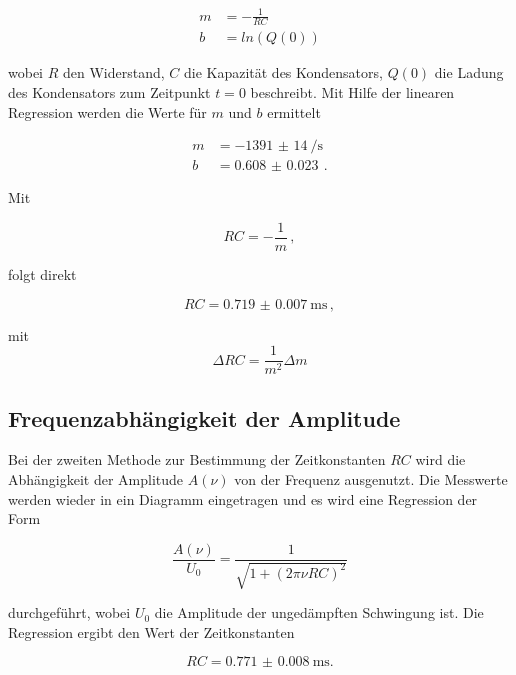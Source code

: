 \begin{align*}
  m &= - \frac{1}{RC} \\
  b &= ln(Q(0))
\end{align*}

wobei $R$ den Widerstand, $C$ die Kapazität des Kondensators, $Q(0)$ die Ladung des Kondensators zum Zeitpunkt
$t=0$ beschreibt. Mit Hilfe der linearen Regression werden die Werte für $m$ und $b$ ermittelt

\begin{align*}
  m &= \SI{-1391(14)}{\per\second} \\
  b &= \SI{0.608(23)}{} \, .
\end{align*}

Mit

\begin{equation*}
  RC = -\frac{1}{m} \, ,
\end{equation*}

folgt direkt

\begin{equation*}
  RC = \SI{0.719(7)}{\milli\second} \, ,
\end{equation*}

mit
\begin{equation*}
  \Delta RC = \frac{1}{m^2}\Delta m
\end{equation*}

\subsection{Frequenzabhängigkeit der Amplitude}

Bei der zweiten Methode zur Bestimmung der Zeitkonstanten $RC$ wird die Abhängigkeit der
Amplitude $A(\nu)$ von der Frequenz ausgenutzt. Die Messwerte werden wieder in ein Diagramm eingetragen
und es wird eine Regression der Form

\begin{equation*}
  \frac{A(\nu)}{U_0} = \frac{1}{\sqrt{1+(2 \pi \nu RC)^2}}
\end{equation*}

durchgeführt, wobei $U_0$ die Amplitude der ungedämpften Schwingung ist.
Die Regression ergibt den Wert der Zeitkonstanten

\begin{equation*}
  RC = \SI{0.771(8)}{\milli\second}.
\end{equation*}

